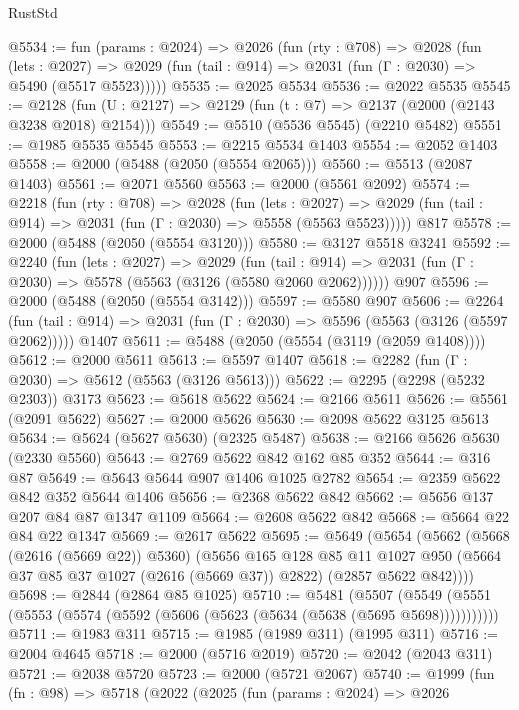\begin{lexlean}{RustStd}
\begin{coremodule}
@5534 := fun (params : @2024) =>
  @2026
    (fun (rty : @708) =>
    @2028
      (fun (lets : @2027) =>
      @2029 (fun (tail : @914) => @2031 (fun (Γ : @2030) => @5490 (@5517 @5523)))))
@5535 := @2025 @5534
@5536 := @2022 @5535
@5545 := @2128 (fun (U : @2127) => @2129 (fun (t : @7) => @2137 (@2000 (@2143 @3238 @2018) @2154)))
@5549 := @5510 (@5536 @5545) (@2210 @5482)
@5551 := @1985 @5535 @5545
@5553 := @2215 @5534 @1403
@5554 := @2052 @1403
@5558 := @2000 (@5488 (@2050 (@5554 @2065)))
@5560 := @5513 (@2087 @1403)
@5561 := @2071 @5560
@5563 := @2000 (@5561 @2092)
@5574 := @2218
    (fun (rty : @708) =>
    @2028
      (fun (lets : @2027) =>
      @2029 (fun (tail : @914) => @2031 (fun (Γ : @2030) => @5558 (@5563 @5523)))))
    @817
@5578 := @2000 (@5488 (@2050 (@5554 @3120)))
@5580 := @3127 @5518 @3241
@5592 := @2240
    (fun (lets : @2027) =>
    @2029
      (fun (tail : @914) => @2031 (fun (Γ : @2030) => @5578 (@5563 (@3126 (@5580 @2060 @2062))))))
    @907
@5596 := @2000 (@5488 (@2050 (@5554 @3142)))
@5597 := @5580 @907
@5606 := @2264
    (fun (tail : @914) => @2031 (fun (Γ : @2030) => @5596 (@5563 (@3126 (@5597 @2062)))))
    @1407
@5611 := @5488 (@2050 (@5554 (@3119 (@2059 @1408))))
@5612 := @2000 @5611
@5613 := @5597 @1407
@5618 := @2282 (fun (Γ : @2030) => @5612 (@5563 (@3126 @5613)))
@5622 := @2295 (@2298 (@5232 @2303)) @3173
@5623 := @5618 @5622
@5624 := @2166 @5611
@5626 := @5561 (@2091 @5622)
@5627 := @2000 @5626
@5630 := @2098 @5622 @3125 @5613
@5634 := @5624 (@5627 @5630) (@2325 @5487)
@5638 := @2166 @5626 @5630 (@2330 @5560)
@5643 := @2769 @5622 @842 @162 @85 @352
@5644 := @316 @87
@5649 := @5643 @5644 @907 @1406 @1025 @2782
@5654 := @2359 @5622 @842 @352 @5644 @1406
@5656 := @2368 @5622 @842
@5662 := @5656 @137 @207 @84 @87 @1347 @1109
@5664 := @2608 @5622 @842
@5668 := @5664 @22 @84 @22 @1347
@5669 := @2617 @5622
@5695 := @5649
    (@5654
      (@5662
        (@5668 (@2616 (@5669 @22)) @5360)
        (@5656
          @165
          @128
          @85
          @11
          @1027
          @950
          (@5664 @37 @85 @37 @1027 (@2616 (@5669 @37)) @2822)
          (@2857 @5622 @842))))
@5698 := @2844 (@2864 @85 @1025)
@5710 := @5481
    (@5507 (@5549 (@5551 (@5553 (@5574 (@5592 (@5606 (@5623 (@5634 (@5638 (@5695 @5698)))))))))))
@5711 := @1983 @311
@5715 := @1985 (@1989 @311) (@1995 @311)
@5716 := @2004 @4645
@5718 := @2000 (@5716 @2019)
@5720 := @2042 (@2043 @311)
@5721 := @2038 @5720
@5723 := @2000 (@5721 @2067)
@5740 := @1999
    (fun (fn : @98) =>
    @5718
      (@2022
        (@2025
          (fun (params : @2024) =>
          @2026

\end{coremodule}
\end{lexlean}
